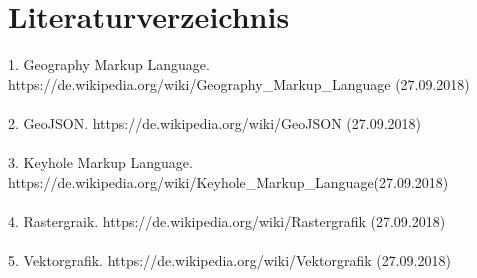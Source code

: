 \documentclass[]{article}
\begin{document}
\newpage
\section{Literaturverzeichnis}

1. Geography Markup Language. https://de.wikipedia.org/wiki/Geography\_Markup\_Language (27.09.2018)\\
\\

2. GeoJSON. https://de.wikipedia.org/wiki/GeoJSON (27.09.2018)\\
\\

3. Keyhole Markup Language. https://de.wikipedia.org/wiki/Keyhole\_Markup\_Language(27.09.2018)\\
\\

4. Rastergraik. https://de.wikipedia.org/wiki/Rastergrafik (27.09.2018)\\
\\

5. Vektorgrafik. https://de.wikipedia.org/wiki/Vektorgrafik (27.09.2018)
\end{document}
